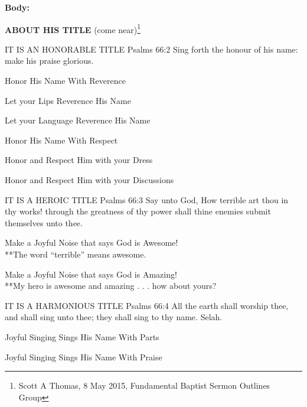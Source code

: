 \noindent \textbf{Body:} 
\begin{compactenum}[I.][5]
    \item \textbf{ABOUT HIS TITLE}  (come near)\footnote{Scott A Thomas, 8 May 2015, Fundamental Baptist Sermon Outlines Group}
        \begin{compactenum}[A.]
        \item IT IS AN HONORABLE TITLE 
Psalms 66:2  Sing forth the honour of his name: make his praise glorious.
        \begin{compactenum}[1.]
            \item Honor His Name With Reverence
            \begin{compactenum}[a.]
                \item Let your Lips Reverence His Name
                \item Let your Language Reverence His Name
            \end{compactenum}
            \item Honor His Name With Respect
            \begin{compactenum}[a.]
                \item Honor and Respect Him with your Dress
                \item Honor and Respect Him with your Discussions
            \end{compactenum}
        \end{compactenum}
        \item IT IS A HEROIC TITLE
 Psalms 66:3  Say unto God, How terrible art thou in thy
works! through the greatness of thy power shall thine enemies submit themselves unto thee.
        \begin{compactenum}[1.]
            \item Make a Joyful Noise that says God is Awesome!\\
**The word “terrible” means awesome.
            \item Make a Joyful Noise that says God is Amazing!\\
**My hero is awesome and amazing . . . how about yours?
        \end{compactenum}
        \item IT IS A HARMONIOUS TITLE
Psalms 66:4  All the earth shall worship thee, and
shall sing unto thee; they shall sing to thy name. Selah.
        \begin{compactenum}[1.]
            \item Joyful Singing Sings His Name With Parts
            \item  Joyful Singing Sings His Name With Praise\\

\end{compactenum}
\end{compactenum}
\end{compactenum}
